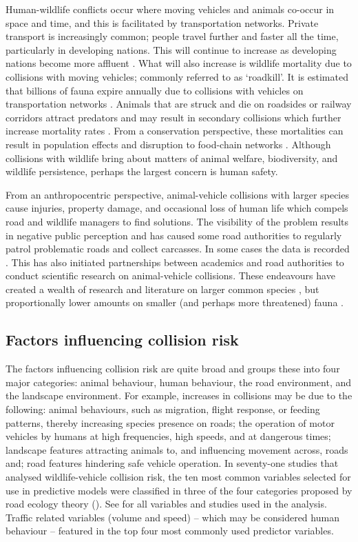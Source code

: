 Human-wildlife conflicts occur where moving vehicles and animals co-occur in space and time, and this is facilitated by transportation networks. Private transport is increasingly common; people travel further and faster all the time, particularly in developing nations. This will continue to increase as developing nations become more affluent \citep{rvdr15}. What will also increase is wildlife mortality due to collisions with moving vehicles; commonly referred to as `roadkill'. It is estimated that billions of fauna expire annually due to collisions with vehicles on transportation networks \citep{seil06}. Animals that are struck and die on roadsides or railway corridors attract predators and may result in secondary collisions which further increase mortality rates \citep{spel98}. From a conservation perspective, these mortalities can result in population effects and disruption to food-chain networks \citep{ramp06b,cham10,pola14}.  Although collisions with wildlife bring about matters of animal welfare, biodiversity, and wildlife persistence, perhaps the largest concern is human safety. 

From an anthropocentric perspective, animal-vehicle collisions with larger species cause injuries, property damage, and occasional loss of human life which compels road and wildlife managers to find solutions. The visibility of the problem results in negative public perception and has caused some road authorities to regularly patrol problematic roads and collect carcasses. In some cases the data is recorded \citep{huij07a}. This has also initiated partnerships between academics and road authorities to conduct scientific research on animal-vehicle collisions.  These endeavours have created a wealth of research and literature on larger common species \citep{biss08b,clev02,romi96,sudh09}, but proportionally lower amounts on smaller (and perhaps more threatened) fauna \citep{clev03}.

\subsection{Factors influencing collision risk}

The factors influencing collision risk are quite broad and \cite{form03} groups these into four major categories: animal behaviour, human behaviour, the road environment, and the landscape environment. For example, increases in collisions may be due to the following: animal behaviours, such as migration, flight response, or feeding patterns, thereby increasing species presence on roads; the operation of motor vehicles by humans at high frequencies, high speeds, and at dangerous times; landscape features attracting animals to, and influencing movement across, roads and; road features hindering safe vehicle operation. In seventy-one studies that analysed wildlife-vehicle collision risk, the ten most common variables selected for use in predictive models were classified in three of the four categories proposed by road ecology theory (). See  for all variables and studies used in the analysis. Traffic related variables (volume and speed) -- which may be considered human behaviour -- featured in the top four most commonly used predictor variables.

